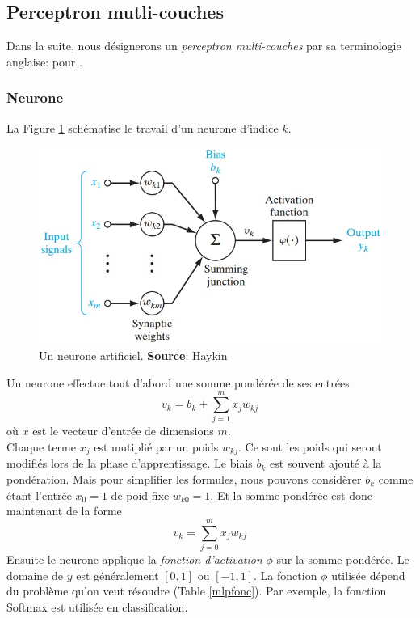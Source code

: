\subsection{Perceptron mutli-couches}
Dans la suite, nous désignerons un \emph{perceptron multi-couches} par sa terminologie anglaise: \mlp pour .
\subsubsection{Neurone}
La Figure \ref{neuronemlp} schématise le travail d'un neurone d'indice $k$.
\begin{figure}
 \centering
 \includegraphics[scale=0.5]{../figures/neurone.jpg}
 \caption{Un neurone artificiel. \textbf{Source}: Haykin\cite{Haykin}}
 \label{neuronemlp}
\end{figure}
Un neurone effectue tout d'abord une somme pondérée de ses entrées \[v_k = b_k+\sum_{j=1}^{m}x_{j}w_{kj}\] où $x$ est le vecteur d'entrée de dimensions $m$.\\
Chaque terme $x_j$ est mutiplié par un poids $w_{kj}$.
Ce sont les poids qui seront modifiés lors de la phase d'apprentissage.
Le biais $b_k$ est souvent ajouté à la pondération.
Mais pour simplifier les formules, nous pouvons considèrer $b_k$ comme étant l'entrée $x_0 = 1$ de poid fixe $w_{k0} = 1$.
Et la somme pondérée est donc maintenant de la forme \[v_k = \sum_{j=0}^{m}x_{j}w_{kj}\]
Ensuite le neurone applique la \emph{fonction d'activation} $\phi$ sur la somme pondérée.
Le domaine de $y$ est généralement $[0,1]$ ou $[-1,1]$.\cite{Haykin,statistica}
La fonction $\phi$ utilisée dépend du problème qu'on veut résoudre (Table \ref{mlpfonc}).
Par exemple, la fonction Softmax est utilisée en classification.\cite{statistica}%


